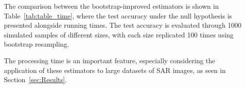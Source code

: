\documentclass[remotesensing,article,submit,moreauthors,pdftex]{Definitions/mdpi}
\begin{document}
The comparison between the bootstrap-improved estimators is shown in
Table~\ref{tab:table_time}, where the test accuracy under the null
hypothesis is presented alongside running times. The test accuracy is
evaluated through 1000 simulated samples of different sizes, with each
size replicated 100 times using bootstrap resampling.

The processing time is an important feature, especially considering the
application of these estimators to large datasets of SAR images, as seen
in Section~\ref{sec:Results}.

\begin{table}[H]
\centering\centering
\caption{\label{tab:table_time}Test accuracy and processing time for each bootstrap-improved estimator. }
\end{table}
\end{document}
